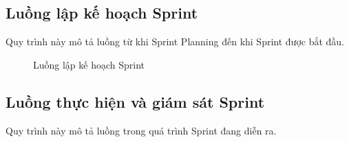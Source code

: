 \documentclass[12pt,a4paper]{report}
\begin{document}
\subsection{Luồng lập kế hoạch Sprint}

Quy trình này mô tả luồng từ khi Sprint Planning đến khi Sprint được bắt đầu.

\begin{figure}[H]
\centering
{}
\caption{Luồng lập kế hoạch Sprint}
\label{fig:sprint_planning_flow}
\end{figure}

\subsection{Luồng thực hiện và giám sát Sprint}

Quy trình này mô tả luồng trong quá trình Sprint đang diễn ra.
\end{document}
